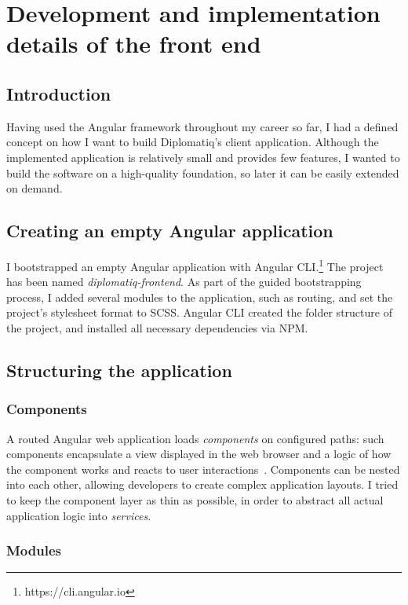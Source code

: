 \section{Development and implementation details of the front end}

\subsection{Introduction}

Having used the Angular framework throughout my career so far, I had a defined concept on how I want to build Diplomatiq's client application. Although the implemented application is relatively small and provides few features, I wanted to build the software on a high-quality foundation, so later it can be easily extended on demand.

\subsection{Creating an empty Angular application}

I bootstrapped an empty Angular application with Angular CLI.\footnote{https://cli.angular.io} The project has been named \emph{diplomatiq-frontend}. As part of the guided bootstrapping process, I added several modules to the application, such as routing, and set the project's stylesheet format to SCSS. Angular CLI created the folder structure of the project, and installed all necessary dependencies via NPM.

\subsection{Structuring the application}

\subsubsection{Components}

A routed Angular web application loads \emph{components} on configured paths: such components encapsulate a view displayed in the web browser and a logic of how the component works and reacts to user interactions~\cite{angular-reference-docs}. Components can be nested into each other, allowing developers to create complex application layouts. I tried to keep the component layer as thin as possible, in order to abstract all actual application logic into \emph{services}.

\subsubsection{Modules}

